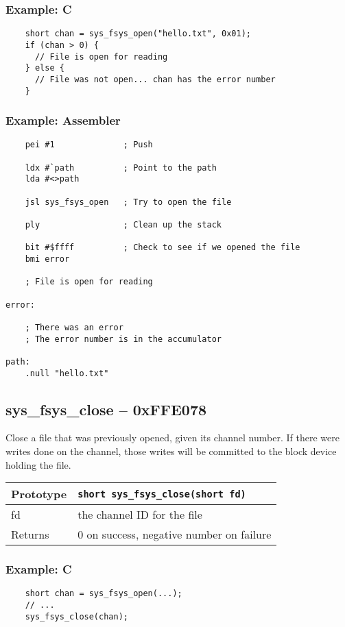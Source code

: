 \subsubsection*{Example: C}
\begin{lstlisting}
    short chan = sys_fsys_open("hello.txt", 0x01);
    if (chan > 0) {
      // File is open for reading
    } else {
      // File was not open... chan has the error number
    }
\end{lstlisting}

\subsubsection*{Example: Assembler}
\begin{verbatim}
    pei #1              ; Push 

    ldx #`path          ; Point to the path
    lda #<>path

    jsl sys_fsys_open   ; Try to open the file

    ply                 ; Clean up the stack

    bit #$ffff          ; Check to see if we opened the file
    bmi error

    ; File is open for reading

error:

    ; There was an error
    ; The error number is in the accumulator

path:
    .null "hello.txt"
\end{verbatim}


\subsection*{sys\_fsys\_close -- 0xFFE078}
Close a file that was previously opened, given its channel number. If there were writes done on the channel, those writes will be committed to the block device holding the file.

\bigskip

\begin{tabular}{|l||l|} \hline
Prototype & \lstinline!short sys_fsys_close(short fd)! \\ \hline
fd & the channel ID for the file \\ \hline
Returns & 0 on success, negative number on failure \\ \hline
\end{tabular}

\subsubsection*{Example: C}
\begin{lstlisting}
    short chan = sys_fsys_open(...);
    // ...
    sys_fsys_close(chan);
\end{lstlisting}

